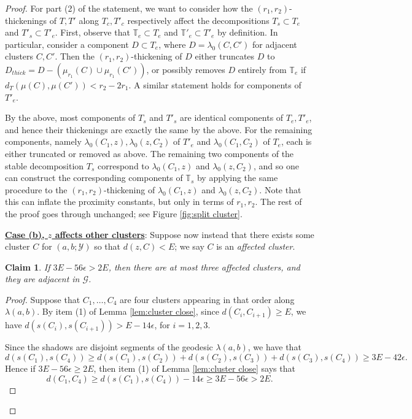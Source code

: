 \documentclass[10pt,a4paper]{amsart}
\newtheorem{claim}{Claim}
\newcommand{\bT}{\mathbb{T}}
\newcommand{\calG}{\mathcal{G}}
\newcommand{\calY}{\mathcal{Y}}
\begin{document}
\begin{proof}
For part (2) of the statement, we want to consider how the $(r_1,r_2)$-thickenings of $T,T'$ along $T_c,T'_c$ respectively affect the decompositions $T_s \subset T_e$ and $T'_s \subset T'_e$.  First, observe that $\bT_e \subset T_e$ and $\bT'_e \subset T'_e$ by definition.  In particular, consider a component $D \subset T_e$, where $D = \lambda_0(C,C')$ for adjacent clusters $C,C'$.  Then the $(r_1,r_2)$-thickening of $D$ either truncates $D$ to $D_{thick} = D - (\mu_{r_1}(C) \cup \mu_{r_1}(C'))$, or possibly removes $D$ entirely from $\bT_e$ if $d_T(\mu(C), \mu(C'))<r_2-2r_1$.  A similar statement holds for components of $T'_e$.

By the above, most components of $T_s$ and $T'_s$ are identical components of $T_e, T'_e$, and hence their thickenings are exactly the same by the above.  For the remaining components, namely $\lambda_0(C_1,z), \lambda_0(z,C_2)$ of $T'_e$ and $\lambda_0(C_1,C_2)$ of $T_e$, each is either truncated or removed as above.  The remaining two components of the stable decomposition $T_s$ correspond to $\lambda_0(C_1,z)$ and $\lambda_0(z,C_2)$, and so one can construct the corresponding components of $\bT_s$ by applying the same procedure to the $(r_1,r_2)$-thickening of $\lambda_0(C_1,z)$ and $\lambda_0(z,C_2)$.  Note that this can inflate the proximity constants, but only in terms of $r_1,r_2$.  The rest of the proof goes through unchanged; see Figure \ref{fig:split cluster}.




\medskip

\underline{\textbf{Case (b), $z$ affects other clusters}}: Suppose now instead that there exists some cluster $C$ for $(a,b;\calY)$ so that $d(z,C)<E$; we say $C$ is an  \emph{affected cluster}.

\begin{claim}\label{claim:bounded affect}
If $3E - 56\epsilon > 2E$, then there are at most three affected clusters, and they are adjacent in $\calG$.
\end{claim}

\begin{proof}
Suppose that $C_1,\dots, C_4$ are four clusters appearing in that order along $\lambda(a,b)$.  By item (1) of Lemma \ref{lem:cluster close}, since $d(C_i, C_{i+1})\geq E$, we have $d(s(C_i), s(C_{i+1}))> E - 14\epsilon$, for $i = 1,2,3$.

Since the shadows are disjoint segments of the geodesic $\lambda(a,b)$, we have that
$$d(s(C_1), s(C_4)) \geq d(s(C_1), s(C_2)) + d(s(C_2), s(C_3))+d(s(C_3), s(C_4)) \geq 3E -42\epsilon.$$
Hence if $3E-56\epsilon \geq 2E$, then item (1) of Lemma \ref{lem:cluster close} says that 
$$d(C_1,C_4) \geq d(s(C_1),s(C_4)) - 14\epsilon \geq 3E-56\epsilon > 2E.$$


\end{proof}
\end{proof}
\end{document}
